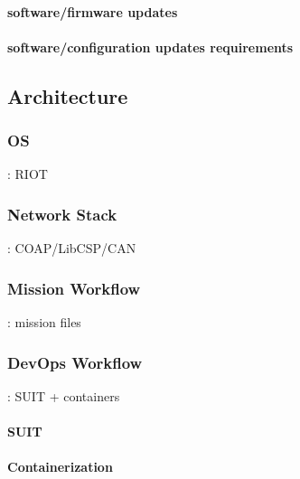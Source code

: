 \paragraph*{software/firmware updates}
\paragraph*{software/configuration updates requirements}

\subsection{Architecture}
\subsubsection{OS}: RIOT
\subsubsection{Network Stack}: COAP/LibCSP/CAN
\subsubsection{Mission Workflow}: mission files
\subsubsection{DevOps Workflow}: SUIT + containers
\paragraph*{SUIT}
\paragraph*{Containerization}
\fi
